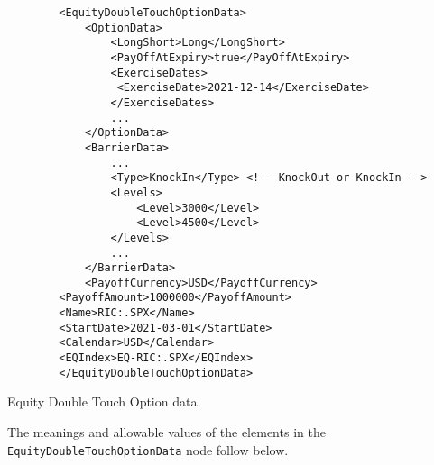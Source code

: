 \begin{listing}[H]
\begin{verbatim}
        <EquityDoubleTouchOptionData>
            <OptionData>
                <LongShort>Long</LongShort>
                <PayOffAtExpiry>true</PayOffAtExpiry>
                <ExerciseDates>
                 <ExerciseDate>2021-12-14</ExerciseDate>
                </ExerciseDates>                     
                ...
            </OptionData>
            <BarrierData>
                ...
                <Type>KnockIn</Type> <!-- KnockOut or KnockIn -->
                <Levels>
                    <Level>3000</Level>
                    <Level>4500</Level>
                </Levels>
                ...
            </BarrierData>
            <PayoffCurrency>USD</PayoffCurrency>
	    <PayoffAmount>1000000</PayoffAmount>
	    <Name>RIC:.SPX</Name>
	    <StartDate>2021-03-01</StartDate>
	    <Calendar>USD</Calendar>
	    <EQIndex>EQ-RIC:.SPX</EQIndex>
        </EquityDoubleTouchOptionData>
\end{verbatim}
\caption{Equity Double Touch Option data}
\label{lst:eqdoubletouchoption_data}
\end{listing}

The meanings and allowable values of the elements in the \lstinline!EquityDoubleTouchOptionData!  node follow below.

